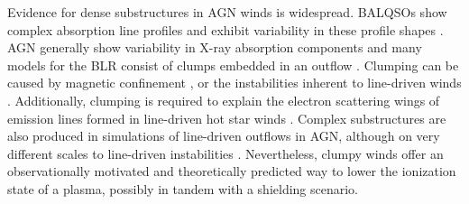 \documentclass[useAMS,usenatbib]{mn2e_x}
\begin{document}
Evidence for dense substructures in AGN winds is widespread.
BALQSOs show complex absorption line profiles \citep{ganguly2006, simonhamann2010}
and exhibit variability in these profile shapes \citep{capellupo2011,capellupo2012,capellupo2014}.
AGN generally show variability in X-ray absorption components \citep[e.g.][]{risaliti2002}
and many models for the BLR consist of clumps embedded in an outflow 
\citep{krolik1981, emmering1992, dekool1995, cassidyraine1996}.
Clumping can be caused by magnetic confinement \citep{dekool1995},
or the instabilities inherent to line-driven winds 
\citep{lucysolomon1970,macgregor1979,carlberg1980,owockirybicki1984,owockirybicki1985}.
Additionally, clumping is required to explain the electron scattering wings of emission lines formed
in line-driven hot star winds \citep{hillier1991eswingsmodel}. Complex substructures 
are also produced in simulations of line-driven 
outflows in AGN, although on very different scales to line-driven instabilities 
\citep{PSK2000,PK04,progakurosawa2010,proga2014}.
Nevertheless, clumpy winds offer an observationally motivated and theoretically 
predicted way to lower the ionization state of a plasma, possibly in tandem
with a shielding scenario. 



\end{document}
